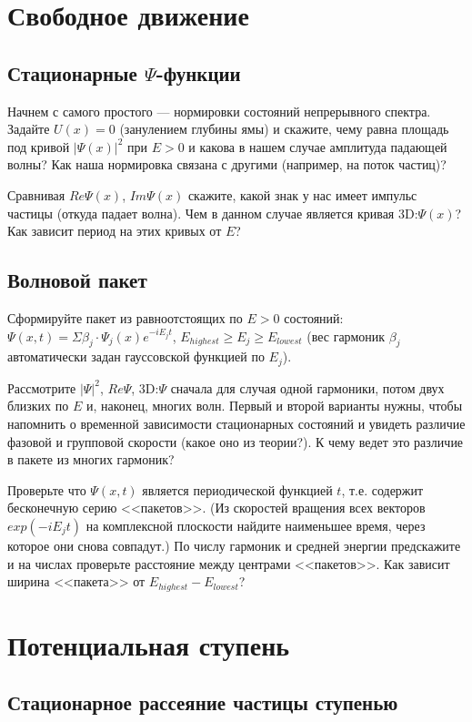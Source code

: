 \documentclass[12pt]{article}
\begin{document}
\hypertarget{U0}{}\section{Свободное движение}
\hypertarget{TasksPsi_k}{}\subsection[Стационарные состояния]{Стационарные $\Psi$-функции}
Начнем с самого простого --- нормировки состояний непрерывного спектра. Задайте $U(x)=0$ (занулением глубины ямы) и скажите, чему равна площадь под кривой $|\Psi (x)|^2$ при $E>0$ и какова в нашем случае амплитуда падающей
волны?  Как наша нормировка связана с другими (например, на поток частиц)?

Сравнивая $Re\Psi(x)$, $Im\Psi(x)$ скажите, какой знак у нас имеет импульс частицы (откуда падает волна). Чем в данном случае является кривая 3D:$\Psi(x)$? Как зависит период на этих кривых от $E$?

\hypertarget{WP}{}\subsection{Волновой пакет}
Сформируйте пакет из
равноотстоящих по $E>0$ состояний:
$\Psi(x,t)=\Sigma \beta_j\cdot\Psi_j
(x)e^{-iE_jt}$, $E_{highest}\ge E_j\ge E_{lowest}$ (вес гармоник $\beta_j$ автоматически задан гауссовской
функцией по $E_j$).

Рассмотрите $|\Psi|^2$, $Re\Psi$,  3D:$\Psi$ сначала для случая одной  гармоники, потом двух близких по $E$ и, наконец, многих волн. Первый и второй варианты нужны, чтобы напомнить о временной зависимости стационарных состояний и увидеть различие фазовой и групповой скорости (какое оно из теории?). К чему ведет это различие в пакете из многих гармоник?

Проверьте что $\Psi(x,t)$ является периодической функцией $t$, т.е. содержит бесконечную серию <<пакетов>>.  (Из скоростей
вращения всех векторов $exp(-iE_jt)$ на комплексной плоскости
найдите наименьшее время, через которое они снова совпадут.) По числу гармоник и средней энергии предскажите и на числах проверьте расстояние между центрами <<пакетов>>. Как зависит ширина <<пакета>> от $E_{highest}-E_{lowest}$?


\hypertarget{step}{}\section{Потенциальная ступень}
\hypertarget{step_stationary}{}\subsection{Стационарное рассеяние частицы ступенью}
\end{document}
